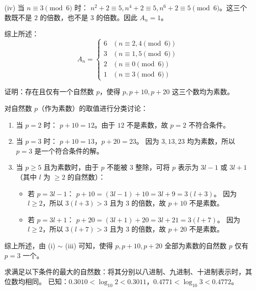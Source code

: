 \begin{questions}
\begin{parts}
\begin{solution}
        (iv) 当 $n \equiv 3 \pmod{6}$ 时：
        $n^2+2 \equiv 5, n^4+2 \equiv 5, n^6+2 \equiv 5 \pmod{6}$。这三个数既不是 $2$ 的倍数，也不是 $3$ 的倍数。因此 $A_n = 1$。
        
        综上所述：
        \[ A_n = \begin{cases} 6 & (n \equiv 2, 4 \pmod{6}) \\ 3 & (n \equiv 1, 5 \pmod{6}) \\ 2 & (n \equiv 0 \pmod{6}) \\ 1 & (n \equiv 3 \pmod{6}) \end{cases}  \]
    \end{solution}
\end{parts}

\question
证明：存在且仅有一个自然数 $p$，使得 $p, p+10, p+20$ 这三个数均为素数。

\begin{solution}
    对自然数 $p$（作为素数）的取值进行分类讨论：

    \begin{enumerate}
        \item 当 $p = 2$ 时：
        $p+10 = 12$。由于 $12$ 不是素数，故 $p=2$ 不符合条件。

        \item 当 $p = 3$ 时：
        $p+10 = 13$，$p+20 = 23$。
        因为 $3, 13, 23$ 均为素数，所以 $p=3$ 是一个符合条件的解。

        \item 当 $p \ge 5$ 且为素数时，由于 $p$ 不能被 $3$ 整除，可将 $p$ 表示为 $3l-1$ 或 $3l+1$（其中 $l$ 为 $\ge 2$ 的自然数）：
        \begin{itemize}
            \item 若 $p = 3l-1$：
            $p+10 = (3l-1) + 10 = 3l+9 = 3(l+3)$。
            因为 $l \ge 2$，所以 $3(l+3) > 3$ 且为 $3$ 的倍数，故 $p+10$ 不是素数。
            \item 若 $p = 3l+1$：
            $p+20 = (3l+1) + 20 = 3l+21 = 3(l+7)$。
            因为 $l \ge 2$，所以 $3(l+7) > 3$ 且为 $3$ 的倍数，故 $p+20$ 不是素数。
        \end{itemize}
    \end{enumerate}

    综上所述，由 (i) $\sim$ (iii) 可知，使得 $p, p+10, p+20$ 全部为素数的自然数 $p$ 仅有 $p=3$ 一个。
\end{solution}

\question
求满足以下条件的最大的自然数：将其分别以八进制、九进制、十进制表示时，其位数均相同。
已知：$0.3010 < \log_{10} 2 < 0.3011$，$0.4771 < \log_{10} 3 < 0.4772$。


\end{questions}
